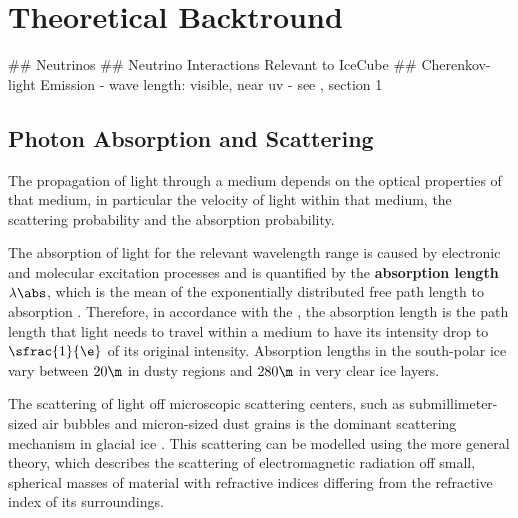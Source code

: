 
\section{Theoretical Backtround}
\label{sec:theoretical_background}

## Neutrinos
## Neutrino Interactions Relevant to IceCube
## Cherenkov-light Emission
- wave length: visible, near uv
- see \cite{ppcpaper}, section 1

\subsection{Photon Absorption and Scattering}
\label{sec:scattering}

The propagation of light through a medium depends on the optical properties of that medium, in particular the velocity of light within that medium, the scattering probability and the absorption probability. \cite{lundberg}

The absorption of light for the relevant wavelength range is caused by electronic and molecular excitation processes \cite{lundberg}
and is quantified by the \textbf{absorption length} $\lambda\abs$, which is the mean of the exponentially distributed free path length to absorption \cite{lundberg}.
Therefore, in accordance with the , the absorption length is the path length that light needs to travel within a medium to have its intensity drop to $\sfrac{1}{\e}$ of its original intensity. \cite{lexikonderphysik}
Absorption lengths in the south-polar ice vary between $20\m$ in dusty regions and $280\m$ in very clear ice layers. \cite{ackermann}\cite{ppcpaper}\cite{icepaper}

The scattering of light off microscopic scattering centers, such as submillimeter-sized air bubbles and micron-sized dust grains \cite{Price1997}\cite{ackermann} is the dominant scattering mechanism in glacial ice \cite{Askebjer1997}\cite{lundberg}. This scattering can be modelled using the more general  theory, which describes the scattering of electromagnetic radiation off small, spherical masses of material with refractive indices differing from the refractive index of its surroundings. \cite{Mie1908}\cite{ackermann}\cite{lundberg}

